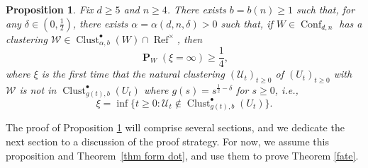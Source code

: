 \documentclass[11pt,reqno]{amsart}
\newtheorem{proposition}[lemma]{Proposition}
\theoremstyle{definition}
\numberwithin{equation}{section}
\newcommand{\1}{\mathbf{1}}
\DeclareMathOperator{\PP}{\mathbf{P}}
\DeclareMathOperator{\Refcon}{\mathrm{Ref}}
\newcommand{\UU}{\mathcal{U}}
\DeclareMathOperator{\Conf}{\mathrm{Conf}}
\DeclareMathOperator{\Clust}{\mathrm{Clust}}
\begin{document}
\begin{proposition}\label{inf xi}
Fix $d \geq 5$ and $n \geq 4$. There exists $b = b (n) \geq 1$ such that, for any $\delta \in (0,\frac12)$, there exists $\alpha = \alpha (d,n,\delta) > 0$ such that, if $W \in \Conf_{d,n}$ has a clustering $\mathcal{W} \in \Clust_{\alpha,b}^\bullet (W) \cap \Refcon^\times$, then 
\begin{equation}\label{eq inf xi}
\PP_{W} (\xi = \infty) \geq \frac14,
\end{equation}
where $\xi$ is the first time that the natural clustering $(\UU_t)_{t \geq 0}$ of $(U_t)_{t \geq 0}$ with $\mathcal{W}$ is not in $\Clust_{g(t),b}^\bullet (U_t)$ where $g(s) = s^{\frac12 - \delta}$ for $s \geq 0$, i.e., 
\[
\xi = \inf \{t \geq 0: \UU_t \notin \Clust_{g(t),b}^\bullet (U_t)\}.
\]
\end{proposition}

The proof of Proposition \ref{inf xi} will comprise several sections, and we dedicate the next section to a discussion of the proof strategy. For now, we assume this proposition and Theorem~\ref{thm form dot}, and use them to prove Theorem \ref{fate}.
\end{document}
